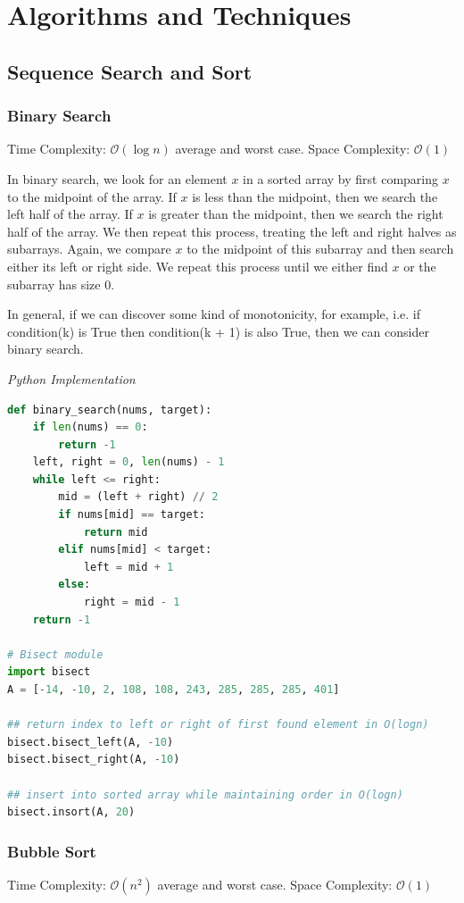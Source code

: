 \documentclass{article}
\newcommand{\bigO}{\mathcal{O}}
\begin{document}
\newpage    
\section{Algorithms and Techniques}
    \subsection{Sequence Search and Sort}
    \subsubsection{Binary Search}
    Time Complexity: $\bigO(\log n)$ average and worst case.  Space Complexity: $\bigO(1)$
    
    In binary search, we look for an element $x$ in a sorted array by first comparing $x$ to the midpoint of the array. If $x$ is less than the midpoint, then we search the left half of the array. If $x$ is greater than the midpoint, then we search the right half of the array. We then repeat this process, treating the left and right halves as subarrays. Again, we compare $x$ to the midpoint of this subarray and then search either its left or right side. We repeat this process until we either find $x$ or the subarray has size 0.
    
    In general, if we can discover some kind of monotonicity, for example, i.e. if condition(k) is True then condition(k + 1) is also True, then we can consider binary search.

\vspace{8pt} \emph{Python Implementation}
\begin{lstlisting}[language=Python]
def binary_search(nums, target):
    if len(nums) == 0:
        return -1
    left, right = 0, len(nums) - 1
    while left <= right:
        mid = (left + right) // 2
        if nums[mid] == target:
            return mid
        elif nums[mid] < target:
            left = mid + 1
        else:
            right = mid - 1
    return -1

# Bisect module    
import bisect
A = [-14, -10, 2, 108, 108, 243, 285, 285, 285, 401]

## return index to left or right of first found element in O(logn)
bisect.bisect_left(A, -10)
bisect.bisect_right(A, -10)

## insert into sorted array while maintaining order in O(logn)
bisect.insort(A, 20)
\end{lstlisting}
    
    \subsubsection{Bubble Sort}
    Time Complexity: $\bigO(n^2)$ average and worst case. Space Complexity: $\bigO(1)$
     
\end{document}
